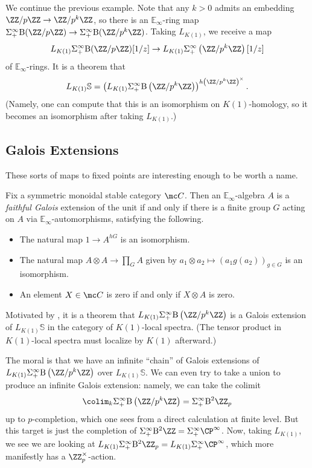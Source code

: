 \documentclass[../notes.tex]{subfiles}
\begin{document}
\begin{example} \label{ex:get-a-galois-extension}
	We continue the previous example. Note that any $k>0$ admits an embedding $\ZZ/p\ZZ\to\ZZ/p^k\ZZ$, so there is an $\mathbb E_\infty$-ring map $\Sigma_+^\infty\mathrm B(\ZZ/p\ZZ)\to\Sigma_+^\infty\mathrm B(\ZZ/p^k\ZZ)$. Taking $L_{K(1)}$, we receive a map
	\[L_{K(1)}\Sigma^\infty_+\mathrm B(\ZZ/p\ZZ)[1/z]\to L_{K(1)}\Sigma_+^\infty\left(\ZZ/p^k\ZZ\right)[1/z]\]
	of $\mathbb E_\infty$-rings. It is a theorem that
	\[L_{K(1)}\mathbb S=\left(L_{K(1)}\Sigma_+^\infty\mathrm B\left(\ZZ/p^k\ZZ\right)\right)^{h\left(\ZZ/p^k\ZZ\right)^\times}.\]
	(Namely, one can compute that this is an isomorphism on $K(1)$-homology, so it becomes an isomorphism after taking $L_{K(1)}$.)
\end{example}

\subsection{Galois Extensions}
These sorts of maps to fixed points are interesting enough to be worth a name.
\begin{definition}
	Fix a symmetric monoidal stable category $\mc C$. Then an $\mathbb E_\infty$-algebra $A$ is a \textit{faithful Galois} extension of the unit if and only if there is a finite group $G$ acting on $A$ via $\mathbb E_\infty$-automorphisms, satisfying the following.
	\begin{itemize}
		\item The natural map $1\to A^{hG}$ is an isomorphism.
		\item The natural map $A\otimes A\to\prod_GA$ given by $a_1\otimes a_2\mapsto(a_1g(a_2))_{g\in G}$ is an isomorphism.
		\item An element $X\in\mc C$ is zero if and only if $X\otimes A$ is zero.
	\end{itemize}
\end{definition}
\begin{remark}
	Motivated by , it is a theorem that $L_{K(1)}\Sigma_+^\infty\mathrm B\left(\ZZ/p^k\ZZ\right)$ is a Galois extension of $L_{K(1)}\mathbb S$ in the category of $K(1)$-local spectra. (The tensor product in $K(1)$-local spectra must localize by $K(1)$ afterward.)
\end{remark}
The moral is that we have an infinite ``chain'' of Galois extensions of $L_{K(1)}\Sigma_+^\infty\mathrm B\left(\ZZ/p^k\ZZ\right)$ over $L_{K(1)}\mathbb S$. We can even try to take a union to produce an infinite Galois extension: namely, we can take the colimit
\[\colim_k\Sigma^\infty_+\mathrm B\left(\ZZ/p^k\ZZ\right)=\Sigma_+^\infty\mathrm B^2\ZZ_p\]
up to $p$-completion, which one sees from a direct calculation at finite level. But this target is just the completion of $\Sigma^\infty_+\mathrm B^2\ZZ=\Sigma^\infty_+\CP^\infty$. Now, taking $L_{K(1)}$, we see we are looking at $L_{K(1)}\Sigma_+^\infty\mathrm B^2\ZZ_p=L_{K(1)}\Sigma_+^\infty\CP^\infty$, which more manifestly has a $\ZZ_p^\times$-action.
\end{document}
